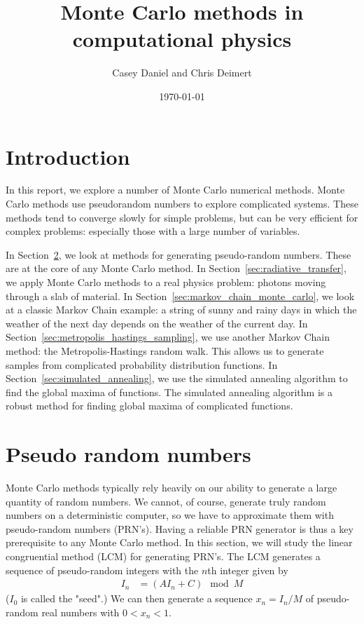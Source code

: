 \documentclass[twocolumn]{myarticle}
\begin{document}
\title{Monte Carlo methods in computational physics}
\author{Casey Daniel and Chris Deimert}
\date{\today}

\maketitle

\section{Introduction}
\label{sec:introduction}

In this report, we explore a number of Monte Carlo numerical methods.
Monte Carlo methods use pseudorandom numbers to explore complicated systems.
These methods tend to converge slowly for simple problems, but can be very efficient for complex problems: especially those with a large number of variables.

In Section~\ref{sec:pseudo_random_numbers}, we look at methods for generating pseudo-random numbers.
These are at the core of any Monte Carlo method.
In Section~\ref{sec:radiative_transfer}, we apply Monte Carlo methods to a real physics problem: photons moving through a slab of material.
In Section~\ref{sec:markov_chain_monte_carlo}, we look at a classic Markov Chain example: a string of sunny and rainy days in which the weather of the next day depends on the weather of the current day.
In Section~\ref{sec:metropolis_hastings_sampling}, we use another Markov Chain method: the Metropolis-Hastings random walk.
This allows us to generate samples from complicated probability distribution functions.
In Section~\ref{sec:simulated_annealing}, we use the simulated annealing algorithm to find the global maxima of functions.
The simulated annealing algorithm is a robust method for finding global maxima of complicated functions.

\section{Pseudo random numbers}
\label{sec:pseudo_random_numbers}

Monte Carlo methods typically rely heavily on our ability to generate a large quantity of random numbers.
We cannot, of course, generate truly random numbers on a deterministic computer, so we have to approximate them with pseudo-random numbers (PRN's).
Having a reliable PRN generator is thus a key prerequisite to any Monte Carlo method.
In this section, we will study the linear congruential method (LCM) for generating PRN's.
The LCM generates a sequence of pseudo-random integers with the $ n $th integer given by
\begin{align}
    I_{n} &= \left( A I_n + C \right) \! \! \! \! \! \mod M
\end{align}
($ I_0 $ is called the "seed".)
We can then generate a sequence $ x_n = I_n/M $ of pseudo-random real numbers with $ 0 < x_n < 1 $.
\end{document}
